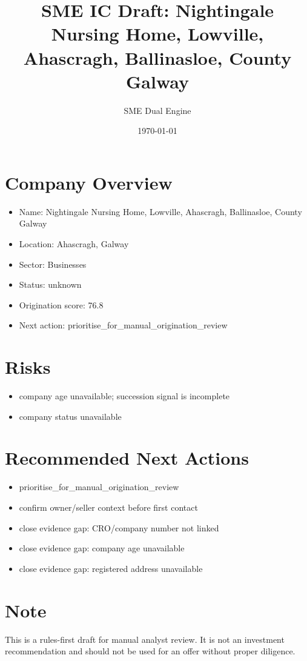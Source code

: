 \documentclass[11pt,a4paper]{article}
\title{SME IC Draft: Nightingale Nursing Home, Lowville, Ahascragh, Ballinasloe, County Galway}
\author{SME Dual Engine}
\date{\today}
\begin{document}
\maketitle
\section*{Company Overview}
\begin{itemize}[leftmargin=1.4em]
\item Name: Nightingale Nursing Home, Lowville, Ahascragh, Ballinasloe, County Galway
\item Location: Ahascragh, Galway
\item Sector: Businesses
\item Status: unknown
\item Origination score: 76.8
\item Next action: prioritise\_for\_manual\_origination\_review
\end{itemize}
\section*{Risks}
\begin{itemize}[leftmargin=1.4em]
\item company age unavailable; succession signal is incomplete
\item company status unavailable
\end{itemize}
\section*{Recommended Next Actions}
\begin{itemize}[leftmargin=1.4em]
\item prioritise\_for\_manual\_origination\_review
\item confirm owner/seller context before first contact
\item close evidence gap: CRO/company number not linked
\item close evidence gap: company age unavailable
\item close evidence gap: registered address unavailable
\end{itemize}
\section*{Note}
This is a rules-first draft for manual analyst review. It is not an investment
recommendation and should not be used for an offer without proper diligence.
\end{document}

